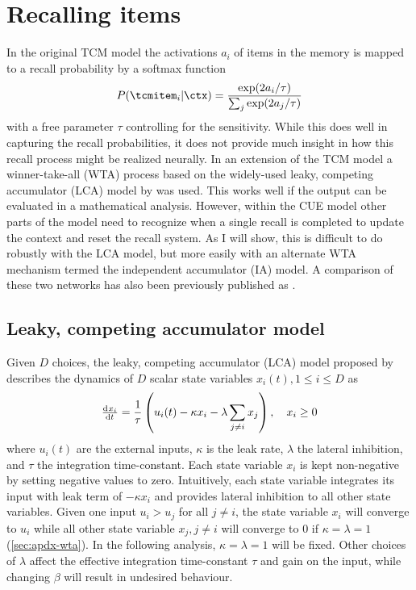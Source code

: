 \chapter{Recalling items}\label{sec:recall}
In the original TCM model \parencite{Howard2002} the activations $a_i$ of items in the memory is mapped to a recall probability by a softmax function
\begin{equation}
    P(\tcmitem_i | \ctx) = \frac{\exp(2a_i/\tau)}{\sum_j \exp(2a_j/\tau)}
\end{equation}
with a free parameter $\tau$ controlling for the sensitivity.
While this does well in capturing the recall probabilities, it does not provide much insight in how this recall process might be realized neurally.
In an extension of the TCM model \parencite{Sederberg2008} a winner-take-all (WTA) process based on the widely-used leaky, competing accumulator (LCA) model by \textcite{Usher2001} was used.
This works well if the output can be evaluated in a mathematical analysis.
However, within the CUE model other parts of the model need to recognize when a single recall is completed to update the context and reset the recall system.
As I will show, this is difficult to do robustly with the LCA model, but more easily with an alternate WTA mechanism termed the independent accumulator (IA) model.
A comparison of these two networks has also been previously published as \textcite{jangosmann2017}.


\section{Leaky, competing accumulator model}
Given $D$ choices, the leaky, competing accumulator (LCA) model proposed by \textcite{Usher2001} describes the dynamics of $D$ scalar state variables $x_i(t), 1 \leq i \leq D$ as
\begin{equation}
    \od{x_i}{t} = \frac{1}{\tau} \del{u_i(t) -\kappa x_i - \lambda \sum_{j \neq i} x_j}, \quad x_i \geq 0 \label{eqn:lca}
\end{equation}
where $u_i(t)$ are the external inputs, $\kappa$ is the leak rate, $\lambda$ the lateral inhibition, and $\tau$ the integration time-constant.
Each state variable $x_i$ is kept non-negative by setting negative values to zero.
Intuitively, each state variable integrates its input with leak term of $-\kappa x_i$ and provides lateral inhibition to all other state variables.
Given one input $u_i > u_j$ for all $j \neq i$, the state variable $x_i$ will converge to $u_i$ while all other state variable $x_j, j \neq i$ will converge to $0$ if $\kappa = \lambda = 1$ (\cref{sec:apdx-wta}).
In the following analysis, $\kappa = \lambda = 1$ will be fixed.
Other choices of $\lambda$ affect the effective integration time-constant $\tau$ and gain on the input, while changing $\beta$ will result in undesired behaviour.

